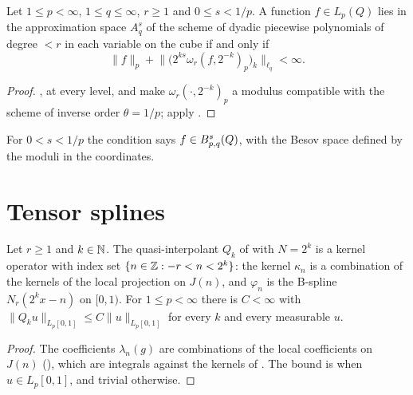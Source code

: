 \begin{theorem}
\label{thm:cube-besov}
\leanok
{}
Let $1 \leq p < \infty$, $1 \leq q \leq \infty$, $r \geq 1$ and $0 \leq s < 1/p$. A function
$f \in L_p(Q)$ lies in the approximation space $A^s_q$ of the scheme of dyadic piecewise
polynomials of degree $< r$ in each variable on the cube if and only if
\[
  \|f\|_p + \bigl\| \bigl( 2^{ks} \omega_r(f, 2^{-k})_p \bigr)_k \bigr\|_{\ell_q} < \infty .
\]
\end{theorem}

\begin{proof}
\leanok
{}, at every level, and  make
$\omega_r(\cdot, 2^{-k})_p$ a modulus compatible with the scheme of inverse order $\theta = 1/p$;
apply .
\end{proof}

For $0 < s < 1/p$ the condition says $f \in B^{s}_{p,q}(Q)$, with the Besov space defined by
the moduli in the coordinates.

\section{Tensor splines}

\begin{lemma}
\label{lem:qi-kernel}
\leanok
{}
Let $r \geq 1$ and $k \in \mathbb{N}$. The quasi-interpolant $Q_k$ of  with
$N = 2^k$ is a kernel operator with index set $\{n \in \mathbb{Z} : -r < n < 2^k\}$: the kernel
$\kappa_n$ is a combination of the kernels of the local projection on $J(n)$, and $\varphi_n$ is the
B-spline $N_r(2^k x - n)$ on $[0, 1)$. For $1 \leq p < \infty$ there is $C < \infty$ with
$\|Q_k u\|_{L_p[0,1]} \leq C \|u\|_{L_p[0,1]}$ for every $k$ and every measurable $u$.
\end{lemma}

\begin{proof}
\leanok
The coefficients $\lambda_n(g)$ are combinations of the local coefficients on $J(n)$
(), which are integrals against the kernels of . The
bound is  when $u \in L_p[0,1]$, and trivial otherwise.
\end{proof}

